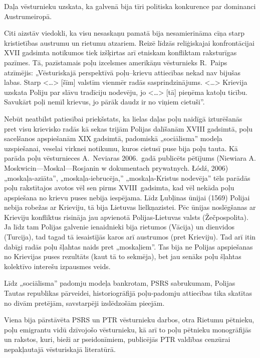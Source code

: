 \documentclass[twoside,a5paper,12pt,fleqn,openany]{extbook}
\newcommand{\citespace}{<\dots{}>}
\begin{document}
Daļa vēsturnieku uzskata, ka galvenā bija tīri politiska konkurence par dominanci Austrumeiropā.

Citi aizstāv viedokli, ka visu nesaskaņu pamatā bija nesamierināma cīņa starp kristietības austrumu un rietumu atzariem. Reizē līdzās reliģiskajai konfrontācijai XVII gadsimta notikumos tiek izšķirtas arī etniskam konfliktam raksturīgas pazīmes. Tā, pazīstamais poļu izcelsmes amerikāņu vēsturnieks R.~Paips atzīmējis: „Vēsturiskajā perspektīvā poļu--krievu attiecības nekad nav bijušas labas. Starp \citespace{} [šīm] valstīm vienmēr radās sasprindzinājums. \citespace{} Krievija uzskata Poliju par slāvu tradīciju nodevēju, jo \citespace{} [tā] pieņēma katoļu ticību. Savukārt poļi nemīl krievus, jo pārāk daudz ir no viņiem cietuši”.

Nebūt neatbilst patiesībai priekšstats, ka lielas daļas poļu naidīgā izturēšanās pret visu krievisko radās kā sekas trijām Polijas dalīšanām XVIII gadsimtā, poļu sacelšanos apspiešanām XIX gadsimtā, padomiskā „sociālisma” modeļa uzspiešanai, veselai virknei notikumu, kuros cietusī puse bija poļu tauta. Kā parāda poļu vēsturnieces A.~Neviaras 2006.~gadā publicēts pētījums (Niewiara A. Moskwicin—Moskal—Rosjanin w dokumentach prywatnych. Łódź, 2006) „moskaļa-aziāta”, „moskaļa-iebrucēja,” „moskaļa-Kristus nodevēja” tēls parādās poļu rakstītajos avotos vēl sen pirms XVIII~gadsimta, kad vēl nekāda poļu apspiešana no krievu puses nebija iespējama. Līdz Ļubļinas ūnijai (1569) Polijai nebija robežas ar Krieviju, tā bija Lietuvas lielkņazistei. Pēc ūnijas noslēgšanas ar Krieviju konfliktus risināja jau apvienotā Polijas-Lietuvas valsts (Žečpospolita). Ja līdz tam Polijas galvenie ienaidnieki bija rietumos (Vācija) un dienvidos (Turcija), tad tagad tā iesaistījās karos arī austrumos (pret Krieviju). Tad arī itin dabīgi radās poļu šļahtas naids pret „moskaļiem”. Tas bija ne Polijas apspiešanas no Krievijas puses rezultāts (kaut tā to sekmēja), bet jau senāks poļu šļahtas kolektīvo interešu izpausmes veids.

Līdz „sociālisma” padomju modeļa bankrotam, PSRS sabrukumam, Polijas Tautas republikas pārveidei, historiogrāfijā poļu-padomju attiecības tika skatītas no divām pretējām, savstarpēji izslēdzošām pieejām.

Viena bija pārstāvēta PSRS un PTR vēsturnieku darbos, otra Rietumu pētnieku, poļu emigrantu vidū dzīvojošo vēsturnieku, kā arī to poļu pētnieku monogrāfijās un rakstos, kuri, bieži ar pseidonīmiem, publicējās PTR valdības cenzūrai nepakļautajā vēsturiskajā literatūrā.
\end{document}
